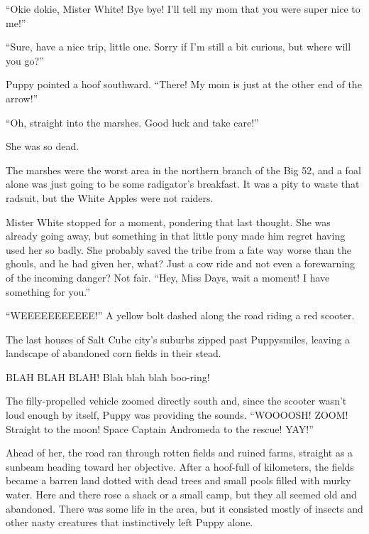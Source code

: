 ``Okie dokie, Mister White! Bye bye! I'll tell my mom that you were super nice to me!''

``Sure, have a nice trip, little one. Sorry if I'm still a bit curious, but where will you go?''

Puppy pointed a hoof southward. ``There! My mom is just at the other end of the arrow!''

``Oh, straight into the marshes. Good luck and take care!''

She was so dead.

The marshes were the worst area in the northern branch of the Big 52, and a foal alone was just going to be some radigator's breakfast. It was a pity to waste that radsuit, but the White Apples were not raiders.

Mister White stopped for a moment, pondering that last thought. She was already going away, but something in that little pony made him regret having used her so badly. She probably saved the tribe from a fate way worse than the ghouls, and he had given her, what? Just a cow ride and not even a forewarning of the incoming danger? Not fair. ``Hey, Miss Days, wait a moment! I have something for you.''


\horizonline


``WEEEEEEEEEEE!'' A yellow bolt dashed along the road riding a red scooter.

The last houses of Salt Cube city's suburbs zipped past Puppysmiles, leaving a landscape of abandoned corn fields in their stead.

BLAH BLAH BLAH! Blah blah blah boo-ring!

The filly-propelled vehicle zoomed directly south and, since the scooter wasn't loud enough by itself, Puppy was providing the sounds. ``WOOOOSH! ZOOM! Straight to the moon! Space Captain Andromeda to the rescue! YAY!''

Ahead of her, the road ran through rotten fields and ruined farms, straight as a sunbeam heading toward her objective. After a hoof-full of kilometers, the fields became a barren land dotted with dead trees and small pools filled with murky water. Here and there rose a shack or a small camp, but they all seemed old and abandoned. There was some life in the area, but it consisted mostly of insects and other nasty creatures that instinctively left Puppy alone.

